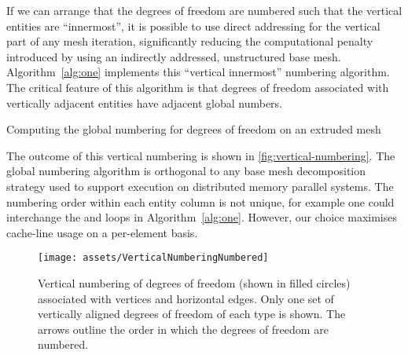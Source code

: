 \documentclass[11pt, a4paper]{scrartcl}
\begin{document}
If we can arrange that the degrees of freedom are numbered such that
the vertical entities are ``innermost'', it is possible to use direct
addressing for the vertical part of any mesh iteration, significantly
reducing the computational penalty introduced by using an indirectly
addressed, unstructured base mesh.  Algorithm~\ref{alg:one} implements
this ``vertical innermost'' numbering algorithm. The critical feature
of this algorithm is that degrees of freedom associated with
vertically adjacent entities have adjacent global numbers.
\begin{algorithm}[htbp]
\caption{Computing the global numbering for degrees of freedom on an extruded mesh}
\label{alg:one}
\begin{algorithmic}
\STATE 
{}
        \STATE {}
            \STATE {}
                      \STATE {}
				\STATE 

				\STATE 
             \ENDFOR
        \ENDFOR
        \STATE {}
	  \STATE 

	  \STATE 
\ENDFOR
\end{algorithmic}
\end{algorithm}

The outcome
of this vertical numbering is shown in
\autoref{fig:vertical-numbering}.  The global numbering algorithm is
orthogonal to any base mesh decomposition strategy used to support
execution on distributed memory parallel systems.  The numbering order
within each entity column is not unique, for example one could
interchange the  and  loops in Algorithm~\ref{alg:one}.
However, our choice maximises cache-line usage on a per-element basis.
\begin{figure}[htbp]
\centering
\texttt{[image: assets/VerticalNumberingNumbered]}
\caption{Vertical numbering of degrees of freedom (shown in filled
  circles) associated with vertices and horizontal edges. Only one set
  of vertically aligned degrees of freedom of each type is shown. The
  arrows outline the order in which the degrees of freedom are
  numbered.}
\label{fig:vertical-numbering}
\end{figure}
\end{document}
